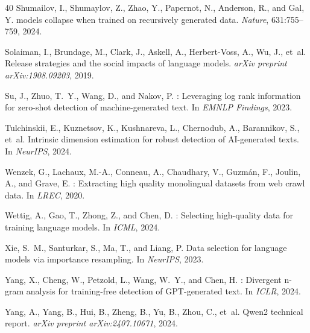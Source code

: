 \documentclass[letterpaper]{article}
\begin{document}
\begin{thebibliography}{40}
Shumailov, I., Shumaylov, Z., Zhao, Y., Papernot, N., Anderson, R., and Gal, Y.
 models collapse when trained on recursively generated data.
\newblock \emph{Nature}, 631:755--759, 2024.

Solaiman, I., Brundage, M., Clark, J., Askell, A., Herbert-Voss, A., Wu, J., et~al.
\newblock Release strategies and the social impacts of language models.
\newblock \emph{arXiv preprint arXiv:1908.09203}, 2019.

Su, J., Zhuo, T.~Y., Wang, D., and Nakov, P.
: Leveraging log rank information for zero-shot detection of machine-generated text.
\newblock In \emph{EMNLP Findings}, 2023.

Tulchinskii, E., Kuznetsov, K., Kushnareva, L., Chernodub, A., Barannikov, S., et~al.
\newblock Intrinsic dimension estimation for robust detection of {AI}-generated texts.
\newblock In \emph{NeurIPS}, 2024.

Wenzek, G., Lachaux, M.-A., Conneau, A., Chaudhary, V., Guzm{\'a}n, F., Joulin, A., and Grave, E.
: Extracting high quality monolingual datasets from web crawl data.
\newblock In \emph{LREC}, 2020.

Wettig, A., Gao, T., Zhong, Z., and Chen, D.
: Selecting high-quality data for training language models.
\newblock In \emph{ICML}, 2024.

Xie, S.~M., Santurkar, S., Ma, T., and Liang, P.
\newblock Data selection for language models via importance resampling.
\newblock In \emph{NeurIPS}, 2023.

Yang, X., Cheng, W., Petzold, L., Wang, W.~Y., and Chen, H.
: Divergent n-gram analysis for training-free detection of {GPT}-generated text.
\newblock In \emph{ICLR}, 2024.

Yang, A., Yang, B., Hui, B., Zheng, B., Yu, B., Zhou, C., et~al.
\newblock Qwen2 technical report.
\newblock \emph{arXiv preprint arXiv:2407.10671}, 2024.

\end{thebibliography}
\end{document}
